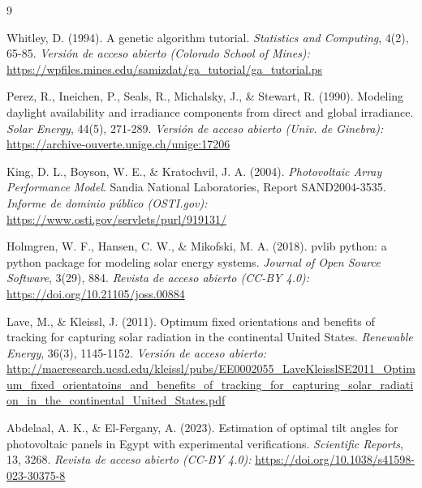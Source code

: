 \documentclass[12pt, a4paper, twocolumn]{article}
\begin{document}
\fontsize{9}{10.5}\selectfont
\renewcommand{\refname}{}
\setlength{\itemsep}{0pt}
\setlength{\parskip}{0pt}
\begin{thebibliography}{9}

Whitley, D. (1994). A genetic algorithm tutorial. \textit{Statistics and Computing}, 4(2), 65-85. \textit{Versión de acceso abierto (Colorado School of Mines):} {\fontsize{7}{8}\selectfont\url{https://wpfiles.mines.edu/samizdat/ga_tutorial/ga_tutorial.ps}}

Perez, R., Ineichen, P., Seals, R., Michalsky, J., \& Stewart, R. (1990). Modeling daylight availability and irradiance components from direct and global irradiance. \textit{Solar Energy}, 44(5), 271-289. \textit{Versión de acceso abierto (Univ. de Ginebra):} {\fontsize{7}{8}\selectfont\url{https://archive-ouverte.unige.ch/unige:17206}}

King, D. L., Boyson, W. E., \& Kratochvil, J. A. (2004). \textit{Photovoltaic Array Performance Model}. Sandia National Laboratories, Report SAND2004-3535. \textit{Informe de dominio público (OSTI.gov):} {\fontsize{7}{8}\selectfont\url{https://www.osti.gov/servlets/purl/919131/}}

Holmgren, W. F., Hansen, C. W., \& Mikofski, M. A. (2018). pvlib python: a python package for modeling solar energy systems. \textit{Journal of Open Source Software}, 3(29), 884. \textit{Revista de acceso abierto (CC-BY 4.0):} {\fontsize{7}{8}\selectfont\url{https://doi.org/10.21105/joss.00884}}

Lave, M., \& Kleissl, J. (2011). Optimum fixed orientations and benefits of tracking for capturing solar radiation in the continental United States. \textit{Renewable Energy}, 36(3), 1145-1152. \textit{Versión de acceso abierto:} {\fontsize{7}{8}\selectfont\url{http://maeresearch.ucsd.edu/kleissl/pubs/EE0002055_LaveKleisslSE2011_Optimum_fixed_orientatoins_and_benefits_of_tracking_for_capturing_solar_radiation_in_the_continental_United_States.pdf}}

Abdelaal, A. K., \& El-Fergany, A. (2023). Estimation of optimal tilt angles for photovoltaic panels in Egypt with experimental verifications. \textit{Scientific Reports}, 13, 3268. \textit{Revista de acceso abierto (CC-BY 4.0):} {\fontsize{7}{8}\selectfont\url{https://doi.org/10.1038/s41598-023-30375-8}}


\end{thebibliography}
\end{document}
